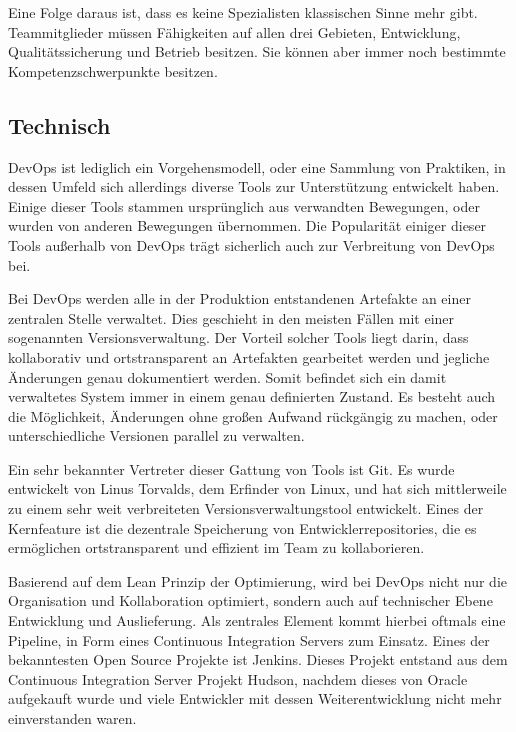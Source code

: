 Eine Folge daraus ist, dass es keine Spezialisten klassischen Sinne mehr gibt. Teammitglieder müssen Fähigkeiten auf allen drei Gebieten, Entwicklung, Qualitätssicherung und Betrieb besitzen. 
Sie können aber immer noch bestimmte Kompetenzschwerpunkte besitzen. \parencite[Vgl.][S. 7]{sacks:2012}

\subsection{Technisch}
DevOps ist lediglich ein Vorgehensmodell, oder eine Sammlung von Praktiken, in dessen Umfeld sich allerdings diverse Tools zur Unterstützung entwickelt haben. 
Einige dieser Tools stammen ursprünglich aus verwandten Bewegungen, oder wurden von anderen Bewegungen übernommen. 
Die Popularität einiger dieser Tools außerhalb von DevOps trägt sicherlich auch zur Verbreitung von DevOps bei.

Bei DevOps werden alle in der Produktion entstandenen Artefakte an einer zentralen Stelle verwaltet. 
Dies geschieht in den meisten Fällen mit einer sogenannten Versionsverwaltung. 
Der Vorteil solcher Tools liegt darin, dass kollaborativ und ortstransparent an Artefakten gearbeitet werden und jegliche Änderungen genau dokumentiert werden. 
Somit befindet sich ein damit verwaltetes System immer in einem genau definierten Zustand. 
Es besteht auch die Möglichkeit, Änderungen ohne großen Aufwand rückgängig zu machen, oder unterschiedliche Versionen parallel zu verwalten. \parencite[Vgl.][S. 9]{fisher-miranda:2014}

Ein sehr bekannter Vertreter dieser Gattung von Tools ist Git. 
Es wurde entwickelt von Linus Torvalds, dem Erfinder von Linux, und hat sich mittlerweile zu einem sehr weit verbreiteten Versionsverwaltungstool entwickelt. 
Eines der Kernfeature ist die dezentrale Speicherung von Entwicklerrepositories, die es ermöglichen ortstransparent und effizient im Team zu kollaborieren. 
\parencite[Vgl.][S. 29 - 44]{loeliger:2012}

Basierend auf dem Lean Prinzip der Optimierung, wird bei DevOps nicht nur die Organisation und Kollaboration optimiert, sondern auch auf technischer Ebene Entwicklung und Auslieferung. 
Als zentrales Element kommt hierbei oftmals eine Pipeline, in Form eines Continuous Integration Servers zum Einsatz. 
Eines der bekanntesten Open Source Projekte ist Jenkins. 
Dieses Projekt entstand aus dem Continuous Integration Server Projekt Hudson, nachdem dieses von Oracle aufgekauft wurde und viele Entwickler mit dessen Weiterentwicklung nicht mehr einverstanden waren. \parencite[Vgl.][S. 4]{smart:2011}

